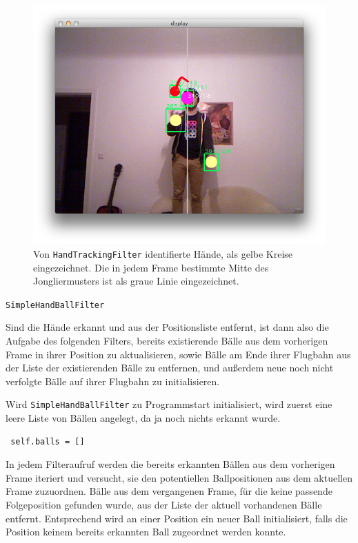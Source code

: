 \documentclass[12pt,a4paper,ngerman]{scrartcl}
\begin{document}
\begin{figure}[H]
    \centering
    \includegraphics[scale=0.45]{img/handtracking-3.png}
    \vspace{-0.5cm}
    \caption{Von \lstinline{HandTrackingFilter} identifierte Hände, als gelbe Kreise eingezeichnet. Die in jedem Frame bestimmte Mitte des Jongliermusters ist als graue Linie eingezeichnet.}
    \label{rects-1}
\end{figure}



\lstinline{SimpleHandBallFilter}

Sind die Hände erkannt und aus der Positionsliste entfernt, ist dann also die 
Aufgabe des folgenden Filters, bereits existierende Bälle aus dem vorherigen Frame in ihrer Position zu aktualisieren, sowie Bälle am Ende ihrer Flugbahn aus der Liste der existierenden Bälle zu entfernen, und außerdem neue noch nicht verfolgte Bälle auf ihrer Flugbahn zu initialisieren.

Wird \lstinline{SimpleHandBallFilter} zu Programmstart initialisiert, wird zuerst eine leere Liste von Bällen angelegt, da ja noch nichts erkannt wurde.

\begin{lstlisting}
 self.balls = []
\end{lstlisting}

In jedem Filteraufruf werden die bereits erkannten Bällen aus dem vorherigen Frame iteriert und versucht, sie den potentiellen Ballpositionen aus dem aktuellen Frame zuzuordnen. 
Bälle aus dem vergangenen Frame, für die keine passende Folgeposition gefunden wurde, aus der Liste der aktuell vorhandenen Bälle entfernt.
Entsprechend wird an einer Position ein 
neuer Ball initialisiert, falls die Position keinem bereits erkannten Ball zugeordnet werden konnte.
\end{document}
